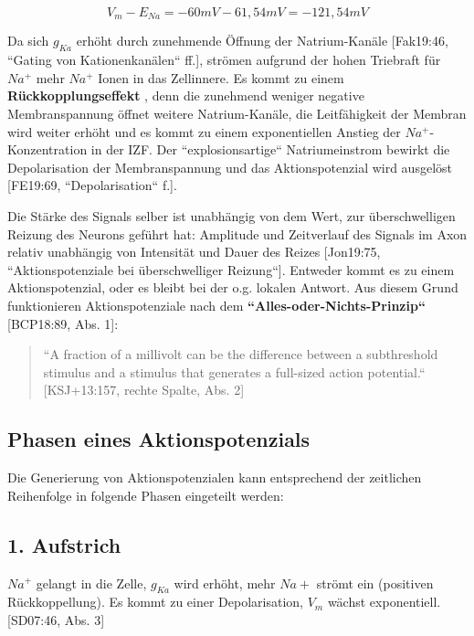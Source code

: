 {{ \begin{equation}
  V_m - E_{Na} = -60 mV - 61,54 mV = -121,54 mV
  \label{eq:gl-triebkraft}
 \end{equation}


Da sich $g_{Ka}$ erhöht durch zunehmende Öffnung der Natrium-Kanäle  [Fak19:46, ``Gating von Kationenkanälen`` ff.], strömen aufgrund der hohen Triebraft für $Na^+$ mehr $Na^+$ Ionen in das Zellinnere. Es kommt zu einem \textbf{Rückkopplungseffekt} , denn die zunehmend weniger negative Membranspannung öffnet weitere Natrium-Kanäle, die Leitfähigkeit der Membran wird weiter erhöht und es kommt zu einem exponentiellen Anstieg der $Na^+$-Konzentration in der IZF. Der ``explosionsartige`` Natriumeinstrom bewirkt die Depolarisation der Membranspannung und das Aktionspotenzial wird ausgelöst [FE19:69, ``Depolarisation`` f.].



Die Stärke des Signals selber ist unabhängig von dem Wert, zur überschwelligen Reizung des Neurons geführt hat: Amplitude und Zeitverlauf des Signals im Axon relativ unabhängig von Intensität und Dauer des Reizes [Jon19:75, ``Aktionspotenziale bei überschwelliger Reizung``]. Entweder kommt es zu einem Aktionspotenzial, oder es bleibt bei der o.g. lokalen Antwort. Aus diesem Grund funktionieren Aktionspotenziale nach dem \textbf{``Alles-oder-Nichts-Prinzip``} [BCP18:89, Abs. 1]\footnotemark[44]:

\blockquote{
 ``A fraction of a millivolt can be the difference between a subthreshold stimulus and a stimulus that generates a full-sized action potential.`` [KSJ+13:157, rechte Spalte, Abs. 2]

}

\subsection{Phasen eines Aktionspotenzials}

Die Generierung von Aktionspotenzialen kann entsprechend der zeitlichen Reihenfolge in folgende Phasen eingeteilt werden:

\subsection*{1. Aufstrich}
$Na^+$ gelangt in die Zelle,  $g_{Ka}$  wird erhöht, mehr $Na+$ strömt ein (positiven Rückkoppellung). 
Es kommt zu einer Depolarisation, $V_m$ wächst exponentiell. [SD07:46, Abs. 3]

}}

